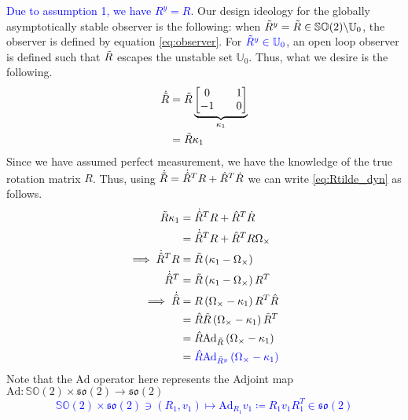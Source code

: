 \documentclass{article}
\newcommand{\SOtwo}{\mathbb{SO}(2)}
\newcommand{\sotwo}{\mathfrak{so}(2)}
\newcommand{\brackets}[1]{\left(#1\right)}
\newcommand{\adjoint}[2]{\text{Ad}_{#1}#2}
\newcommand{\textblue}[1]{\textcolor{blue}{#1}}
\begin{document}
\textblue{Due to assumption 1, we have $R^y = R$}. Our design ideology for the globally asymptotically stable observer is the following: when \textblue{$\Tilde{R}^y = \tilde{R} \in \SOtwo \backslash \mathbb{U}_0$}, the observer is defined by equation \eqref{eq:observer}. For $\textblue{\Tilde{R}^y\in\mathbb{U}_0}$, an open loop observer is defined such that $\Tilde{R}$ escapes the unstable set $\mathbb{U}_0$. Thus, what we desire is the following.
\begin{align}
    \dot{\Tilde{R}} &= \Tilde{R} \underbrace{\begin{bmatrix}
        0 && 1\\
        -1 && 0
    \end{bmatrix}}_{\kappa_1} \nonumber\\
    &= \Tilde{R}\kappa_1 \label{eq:Rtilde_dyn}
\end{align}
Since we have assumed perfect measurement, we have the knowledge of the true rotation matrix $R$. Thus, using $\dot{\Tilde{R}} = \dot{\hat{R}}^TR + \hat{R}^T\dot{R}$ we can write \eqref{eq:Rtilde_dyn} as follows. 
\begin{align}
    \Tilde{R}\kappa_1 &= \dot{\hat{R}}^TR + \hat{R}^T\dot{R}\nonumber\\
    &= \dot{\hat{R}}^TR + \hat{R}^TR\Omega_\times\nonumber\\
    \implies \dot{\hat{R}}^TR &= \Tilde{R}\left(\kappa_1 - \Omega_\times\right)\nonumber\\
    \dot{\hat{R}}^T &= \Tilde{R}\brackets{\kappa_1 - \Omega_\times}R^T\nonumber\\
    \implies \dot{\hat{R}} &= R\brackets{\Omega_\times - \kappa_1}R^T\hat{R} \nonumber\\
    &= \hat{R}\Tilde{R}\brackets{\Omega_\times - \kappa_1}\Tilde{R}^T\nonumber\\
    &= \hat{R}\adjoint{\tilde{R}}{\left(\Omega_\times - \kappa_1\right)}\nonumber\\
    &= \textblue{\hat{R}\adjoint{\tilde{R}^y}{\left(\Omega_\times - \kappa_1\right)}\label{eq:observer_unstable}}
\end{align}
Note that the $\text{Ad}$ operator here represents the Adjoint map $\text{Ad}: \SOtwo\times \sotwo \to \sotwo$ \textblue{\[ \SOtwo\times \sotwo \ni(R_1, v_1) \mapsto \adjoint{R_1}{v_1} \coloneqq R_1 v_1 R_1^T \in \sotwo\]}
\end{document}
